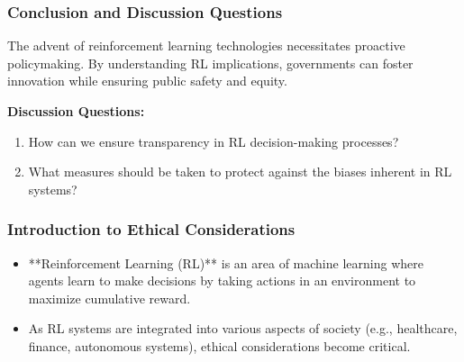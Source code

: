 \documentclass[aspectratio=169]{beamer}
\begin{document}
\begin{frame}[fragile]
    \frametitle{Conclusion and Discussion Questions}
    The advent of reinforcement learning technologies necessitates proactive policymaking. By understanding RL implications, governments can foster innovation while ensuring public safety and equity.

    \textbf{Discussion Questions:}
    \begin{enumerate}
        \item How can we ensure transparency in RL decision-making processes?
        \item What measures should be taken to protect against the biases inherent in RL systems?
    \end{enumerate}
\end{frame}

\begin{frame}[fragile]
    \frametitle{Introduction to Ethical Considerations}
    \begin{itemize}
        \item **Reinforcement Learning (RL)** is an area of machine learning where agents learn to make decisions by taking actions in an environment to maximize cumulative reward.
        \item As RL systems are integrated into various aspects of society (e.g., healthcare, finance, autonomous systems), ethical considerations become critical.
    \end{itemize}
\end{frame}
\end{document}
